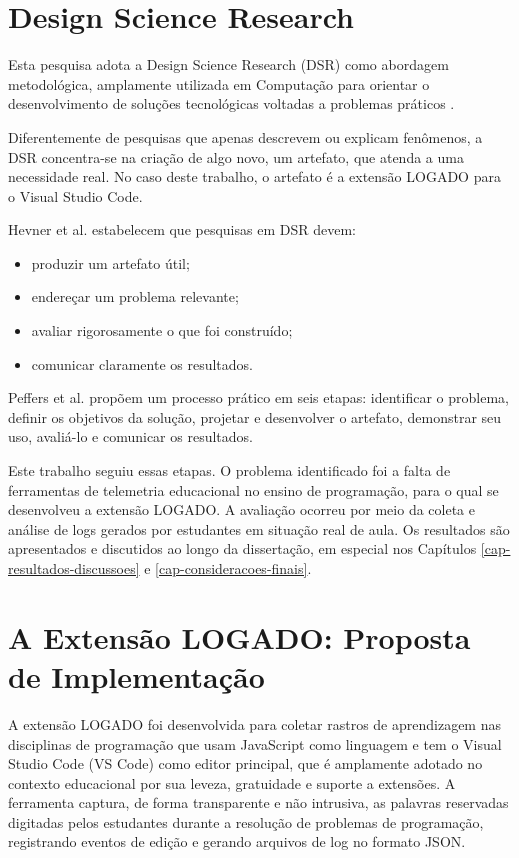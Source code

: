 \section{Design Science Research}
\label{sec:design-science-research}

Esta pesquisa adota a Design Science Research (DSR) como abordagem metodológica, amplamente utilizada em Computação para orientar o desenvolvimento de soluções tecnológicas voltadas a problemas práticos \cite{hevner2004design, peffers2007design}.

Diferentemente de pesquisas que apenas descrevem ou explicam fenômenos, a DSR concentra-se na criação de algo novo, um artefato, que atenda a uma necessidade real. No caso deste trabalho, o artefato é a extensão LOGADO para o Visual Studio Code.

Hevner et al. \cite{hevner2004design} estabelecem que pesquisas em DSR devem:
\begin{itemize}
    \item produzir um artefato útil;
    \item endereçar um problema relevante;
    \item avaliar rigorosamente o que foi construído;
    \item comunicar claramente os resultados.
\end{itemize}

Peffers et al. \cite{peffers2007design} propõem um processo prático em seis etapas: identificar o problema, definir os objetivos da solução, projetar e desenvolver o artefato, demonstrar seu uso, avaliá-lo e comunicar os resultados.

Este trabalho seguiu essas etapas. O problema identificado foi a falta de ferramentas de telemetria educacional no ensino de programação, para o qual se desenvolveu a extensão LOGADO. A avaliação ocorreu por meio da coleta e análise de logs gerados por estudantes em situação real de aula. Os resultados são apresentados e discutidos ao longo da dissertação, em especial nos Capítulos \ref{cap-resultados-discussoes} e \ref{cap-consideracoes-finais}.

\section{A Extensão LOGADO: Proposta de Implementação}
\label{sec:extensao-logado}

A extensão LOGADO foi desenvolvida para coletar rastros de aprendizagem nas disciplinas de programação que usam JavaScript como linguagem e tem o Visual Studio Code (VS Code) como editor principal, que é amplamente adotado no contexto educacional por sua leveza, gratuidade e suporte a extensões. A ferramenta captura, de forma transparente e não intrusiva, as palavras reservadas digitadas pelos estudantes durante a resolução de problemas de programação, registrando eventos de edição e gerando arquivos de log no formato JSON.

